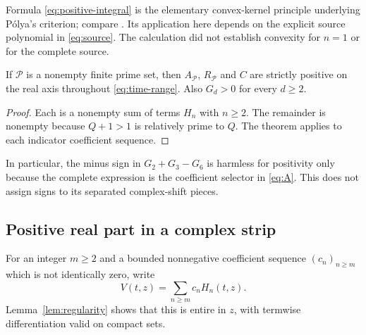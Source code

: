 Formula \eqref{eq:positive-integral} is the elementary convex-kernel
principle underlying P\'olya's criterion; compare
\cite[Theorem 3.4]{Csordas}. Its application here depends on the explicit
source polynomial in \eqref{eq:source}. The calculation did not establish
convexity for $n=1$ or for the complete source.

\begin{corollary}\label{cor:positive-packets}
If $\mathcal P$ is a nonempty finite prime set, then
$A_{\mathcal P}$, $R_{\mathcal P}$ and $C$ are strictly positive on the
real axis throughout \eqref{eq:time-range}. Also $G_d>0$ for every $d\ge2$.
\end{corollary}
\begin{proof}
Each is a nonempty sum of terms $H_n$ with $n\ge2$. The remainder is
nonempty because $Q+1>1$ is relatively prime to $Q$. The theorem applies
to each indicator coefficient sequence.
\end{proof}

In particular, the minus sign in $G_2+G_3-G_6$ is harmless for positivity
only because the complete expression is the coefficient selector in
\eqref{eq:A}. This does not assign signs to its separated complex-shift
pieces.

\subsection{Positive real part in a complex strip}

For an integer $m\ge2$ and a bounded nonnegative coefficient sequence
$(c_n)_{n\ge m}$ which is not identically zero, write
\begin{equation}\label{eq:positive-combination}
 V(t,z)=\sum_{n\ge m}c_nH_n(t,z).
\end{equation}
Lemma~\ref{lem:regularity} shows that this is entire in $z$, with
termwise differentiation valid on compact sets.

